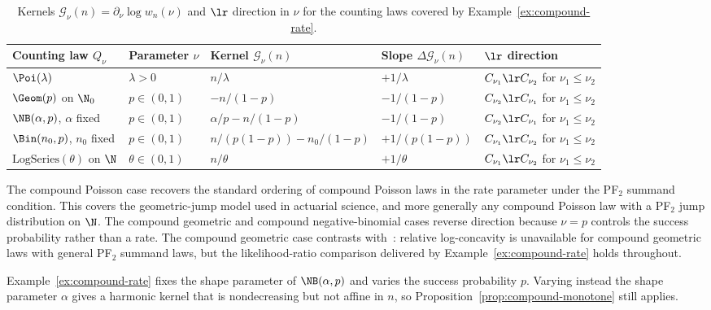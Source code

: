 \documentclass[11pt]{article}
\begin{document}
\begin{table}[ht]
\centering
\footnotesize
\renewcommand{\arraystretch}{1.4}
\caption{Kernels \(\mathcal G_\nu(n)=\partial_\nu\log w_n(\nu)\) and \(\lr\) direction in $\nu$ for the counting laws covered by Example~\ref{ex:compound-rate}.}\label{tab:compound-slopes}
\begin{tabular}{@{}lllll@{}}
\toprule
\textbf{Counting law} \(Q_\nu\) & \textbf{Parameter} \(\nu\) & \textbf{Kernel} \(\mathcal G_\nu(n)\) & \textbf{Slope} \(\Delta\mathcal G_\nu(n)\) & \textbf{$\lr$ direction} \\
\midrule
$\Poi(\lambda)$ & $\lambda>0$ & $n/\lambda$ & $+1/\lambda$ & $C_{\nu_1}\lr C_{\nu_2}$ for $\nu_1\le\nu_2$ \\
$\Geom(p)$ on $\N_0$ & $p\in(0,1)$ & $-n/(1-p)$ & $-1/(1-p)$ & $C_{\nu_2}\lr C_{\nu_1}$ for $\nu_1\le\nu_2$ \\
$\NB(\alpha,p)$, $\alpha$ fixed & $p\in(0,1)$ & $\alpha/p-n/(1-p)$ & $-1/(1-p)$ & $C_{\nu_2}\lr C_{\nu_1}$ for $\nu_1\le\nu_2$ \\
$\Bin(n_0,p)$, $n_0$ fixed & $p\in(0,1)$ & $n/(p(1-p))-n_0/(1-p)$ & $+1/(p(1-p))$ & $C_{\nu_1}\lr C_{\nu_2}$ for $\nu_1\le\nu_2$ \\
$\mathrm{LogSeries}(\theta)$ on $\N$ & $\theta\in(0,1)$ & $n/\theta$ & $+1/\theta$ & $C_{\nu_1}\lr C_{\nu_2}$ for $\nu_1\le\nu_2$ \\
\bottomrule
\end{tabular}
\end{table}

The compound Poisson case recovers the standard ordering of compound Poisson laws in the rate parameter under the PF$_2$ summand condition. This covers the geometric-jump model used in actuarial science, and more generally any compound Poisson law with a PF$_2$ jump distribution on \(\N\). The compound geometric and compound negative-binomial cases reverse direction because \(\nu=p\) controls the success probability rather than a rate. The compound geometric case contrasts with~\cite{XiaLv2024}: relative log-concavity is unavailable for compound geometric laws with general PF$_2$ summand laws, but the likelihood-ratio comparison delivered by Example~\ref{ex:compound-rate} holds throughout.

Example~\ref{ex:compound-rate} fixes the shape parameter of $\NB(\alpha,p)$ and varies the success probability $p$. Varying instead the shape parameter $\alpha$ gives a harmonic kernel that is nondecreasing but not affine in $n$, so Proposition~\ref{prop:compound-monotone} still applies.
\end{document}
